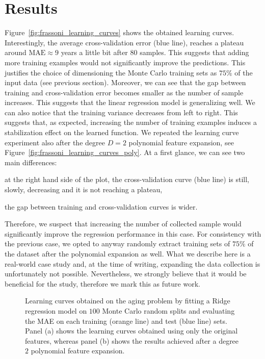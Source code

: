 \section{Results} \label{sec:frassoni_results}
Figure~\ref{fig:frassoni_learning_curves} shows the obtained learning curves. Interestingly, the average cross-validation error (blue line), reaches a plateau around $\text{MAE} \approx 9$ years a little bit after $80$ samples. This suggests that adding more training examples would not significantly improve the predictions. This justifies the choice of dimensioning the Monte Carlo training sets as $75\%$ of the input data (see previous section).
Moreover, we can see that the gap between training and cross-validation error becomes smaller as the number of sample increases. This suggests that the linear regression model is generalizing well. We can also notice that the training variance decreases from left to right. This suggests that, as expected, increasing the number of training examples induces a stabilization effect on the learned function.
We repeated the learning curve experiment also after the degree $D=2$ polynomial feature expansion, see Figure~\ref{fig:frassoni_learning_curves_poly}. At a first glance, we can see two main differences:
\begin{enumerate*}[label=(\roman*)]
	\item at the right hand side of the plot, the cross-validation curve (blue line) is still, slowly, decreasing and it is not reaching a plateau,
	\item the gap between training and cross-validation curves is wider.
\end{enumerate*}
Therefore, we suspect that increasing the number of collected sample would significantly improve the regression performance in this case.
For consistency with the previous case, we opted to anyway randomly extract training sets of $75\%$ of the dataset after the polynomial expansion as well.
What we describe here is a real-world case study and, at the time of writing, expanding the data collection is unfortunately not possible. Nevertheless, we strongly believe that it would be beneficial for the study, therefore we mark this as future work.


\begin{figure}[]
	\centering
	\caption{Learning curves obtained on the aging problem by fitting a Ridge regression model on $100$ Monte Carlo random splits and evaluating the MAE on each training (orange line) and test (blue line) sets. Panel (a) shows the learning curves obtained using only the original features, whereas panel (b) shows the results achieved after a degree $2$ polynomial feature expansion.}
\end{figure}


